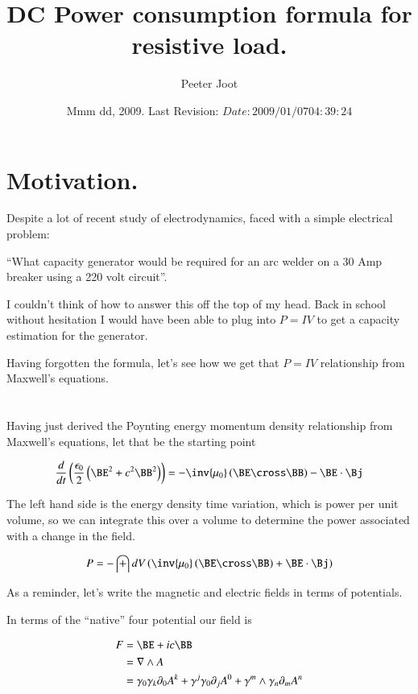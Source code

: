 \documentclass{article}
\title{ DC Power consumption formula for resistive load. }
\author{Peeter Joot}
\date{ Mmm dd, 2009.  Last Revision: $Date: 2009/01/07 04:39:24 $ }
\begin{document}
\maketitle{}

\section{ Motivation. }

Despite a lot of recent study of electrodynamics, faced with a simple electrical problem:

``What capacity generator would be required for an arc welder on a 30 Amp breaker using a 220 volt circuit''.

I couldn't think of how to answer this off the top of my head.  Back in school without hesitation I would have
been able to plug into $P = I V$ to get a capacity estimation for the generator.

Having forgotten the formula, let's see how we get that $P = I V$ relationship from Maxwell's equations.

\section{}

Having just derived the Poynting energy momentum density relationship from Maxwell's equations, let that be the starting
point

\begin{align*}
\frac{d}{dt}\left(\frac{\epsilon_0}{2}\left(\BE^2 + c^2\BB^2 \right) \right) = - \inv{\mu_0} \left(\BE \cross \BB \right) - \BE \cdot \Bj
\end{align*}

The left hand side is the energy density time variation, which is power per unit volume, so we can integrate this
over a volume to determine the power associated with a change in the field.

\begin{align*}
P = -\int dV \left( \inv{\mu_0} \left(\BE \cross \BB \right) + \BE \cdot \Bj \right)
\end{align*}

As a reminder, let's write the magnetic and electric fields in terms of potentials.

In terms of the ``native'' four potential our field is

\begin{align*}
F 
&= \BE + ic \BB \\
&= \grad \wedge A \\
&= \gamma_0 \gamma_k \partial_0 A^k + \gamma^j \gamma_0 \partial_j A^0 + \gamma^m \wedge \gamma_n \partial_m A^n \\
\end{align*}
\end{document}
